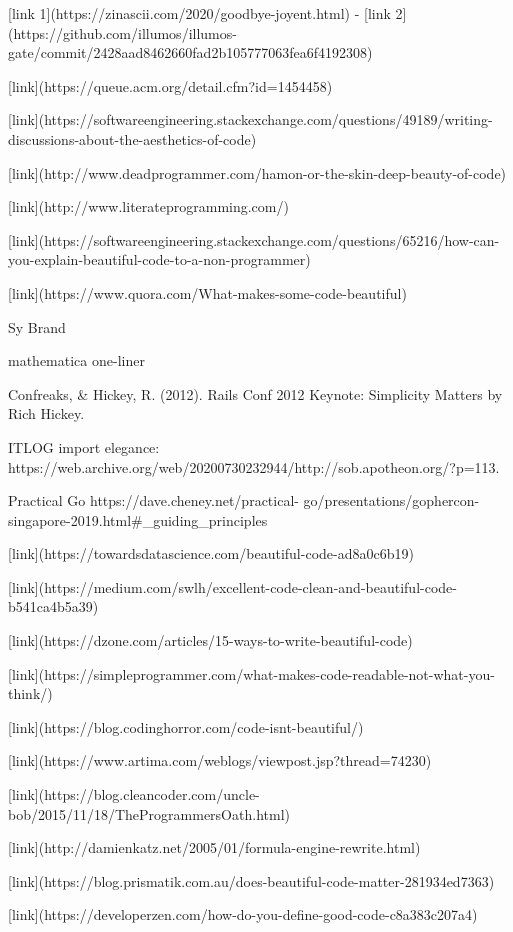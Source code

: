 [link 1](https://zinascii.com/2020/goodbye-joyent.html) - [link 2](https://github.com/illumos/illumos-gate/commit/2428aad8462660fad2b105777063fea6f4192308)

[link](https://queue.acm.org/detail.cfm?id=1454458)

[link](https://softwareengineering.stackexchange.com/questions/49189/writing-discussions-about-the-aesthetics-of-code)

[link](http://www.deadprogrammer.com/hamon-or-the-skin-deep-beauty-of-code)

[link](http://www.literateprogramming.com/)

[link](https://softwareengineering.stackexchange.com/questions/65216/how-can-you-explain-beautiful-code-to-a-non-programmer)

[link](https://www.quora.com/What-makes-some-code-beautiful)

Sy Brand \citep{cpppconference_keynote_2022}

mathematica one-liner

Confreaks, & Hickey, R. (2012). Rails Conf 2012 Keynote: Simplicity Matters by Rich Hickey.

ITLOG import elegance: https://web.archive.org/web/20200730232944/http://sob.apotheon.org/?p=113.

Practical Go https://dave.cheney.net/practical-
go/presentations/gophercon-singapore-2019.html#_guiding_principles

[link](https://towardsdatascience.com/beautiful-code-ad8a0c6b19)

[link](https://medium.com/swlh/excellent-code-clean-and-beautiful-code-b541ca4b5a39)

[link](https://dzone.com/articles/15-ways-to-write-beautiful-code)

[link](https://simpleprogrammer.com/what-makes-code-readable-not-what-you-think/)

[link](https://blog.codinghorror.com/code-isnt-beautiful/)

[link](https://www.artima.com/weblogs/viewpost.jsp?thread=74230)

[link](https://blog.cleancoder.com/uncle-bob/2015/11/18/TheProgrammersOath.html)

[link](http://damienkatz.net/2005/01/formula-engine-rewrite.html)

[link](https://blog.prismatik.com.au/does-beautiful-code-matter-281934ed7363)

[link](https://developerzen.com/how-do-you-define-good-code-c8a383c207a4)

